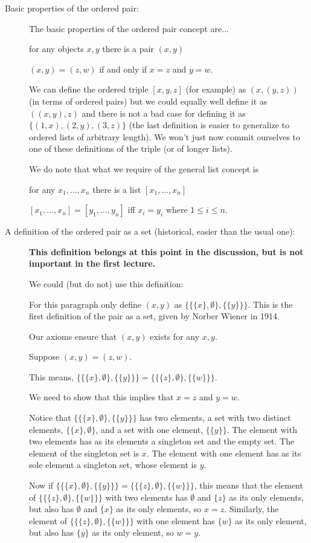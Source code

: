 \documentclass[12pt]{article}
\begin{document}
\begin{description}
\item[Basic properties of the ordered pair:]

The basic properties of the ordered pair concept are...

for any objects $x,y$ there is a pair $(x,y)$

$(x,y) = (z,w)$ if and only if $x=z$ and $y=w$.

We can define the ordered triple $[x,y,z]$ (for example) as $(x,(y,z))$ (in terms of ordered pairs) but we could equally well define it as $((x,y),z)$ and there is not a bad case for defining it as $\{(1,x),(2,y),(3,z)\}$ (the last definition is easier to generalize to ordered lists of arbitrary length).  We won't just now commit ourselves to one of these definitions of the triple
(or of longer lists).

We do note that what we require of the general list concept is

for any $x_1,\ldots,x_n$ there is a list $[x_1,\ldots,x_n]$

$[x_1,\ldots,x_n] = [y_1,\ldots,y_n]$ iff $x_i = y_i$ where $1 \leq i \leq n$.

\item[A definition of the ordered pair as a set (historical, easier than the usual one):]

{\bf This definition belongs at this point in the discussion, but is not important in the first lecture.}

We could (but do not) use this definition:

For this paragraph only define $(x,y)$ as $\{\{\{x\},\emptyset\},\{\{y\}\}\}$.  This is the first definition of the pair as a set, given by Norber Wiener in 1914.

Our axioms ensure that $(x,y)$ exists for any $x,y$.

Suppose $(x,y)=(z,w)$.

This means, $\{\{\{x\},\emptyset\},\{\{y\}\}\}=\{\{\{z\},\emptyset\},\{\{w\}\}\}$.

We need to show that this implies that $x=z$ and $y=w$.

Notice that $\{\{\{x\},\emptyset\},\{\{y\}\}\}$ has two elements, a set with two distinct elements,
$\{\{x\},\emptyset\}$, and a set with one element, $\{\{y\}\}$.  The element with two elements has as its elements
a singleton set and the empty set.  The element of the singleton set is $x$.   The element with one element has
as its sole element a singleton set, whose element is $y$.

Now if $\{\{\{x\},\emptyset\},\{\{y\}\}\}=\{\{\{z\},\emptyset\},\{\{w\}\}\}$, this means that the element of 
$\{\{\{z\},\emptyset\},\{\{w\}\}\}$ with two elements has $\emptyset$ and $\{z\}$ as its only elements,
but also has $\emptyset$ and $\{x\}$ as its only elements, so $x=z$.  Similarly, the element of $\{\{\{z\},\emptyset\},\{\{w\}\}\}$ with one element has $\{w\}$ as its only element, but also has $\{y\}$ as its only element, so $w=y$.


\end{description}
\end{document}
